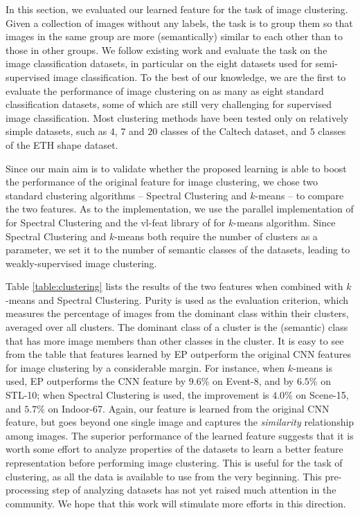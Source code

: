 In this section, we evaluated our learned feature for the task of
image clustering. Given a collection of images without any labels, the
task is to group them so that images in the same group are more
(semantically) similar to each other than to those in other groups.
We follow existing work \citep{Sivic05b,
  Tuytelaars_UnsupervisedSurvey, dai, dai:eccv12b, fakton:eccv12} and
evaluate the task on the image classification datasets, in particular 
on the eight datasets used for semi-supervised image
classification.  To the best of our knowledge, we are the first
to evaluate the performance of image clustering on as many as eight
standard classification datasets, some of which are still very
challenging for supervised image classification. 
Most clustering methods have been tested only on relatively simple
datasets, such as $4$, $7$ and $20$ classes of the Caltech dataset,
and $5$ classes of the ETH shape dataset.

Since our main aim is to validate whether the proposed learning is
able to boost the performance of the original feature for image
clustering, we chose two standard clustering algorithms -- Spectral
Clustering and $k$-means -- to compare the two features.  As to the
implementation, we use the parallel implementation of
\citet{parallel:sc} for Spectral Clustering and the vl-feat library of
\citet{vlfeat} for $k$-means algorithm.  Since Spectral
Clustering and $k$-means both require the number of clusters
as a parameter, we set it to the number of semantic classes of the datasets, leading to
weakly-supervised image clustering. 

Table \ref{table:clustering} lists the results of the two features
when combined with $k$-means and Spectral Clustering.  Purity is used
as the evaluation criterion, which measures the percentage of images
from the dominant class within their clusters, averaged over all
clusters. The dominant class of a cluster is the (semantic) class that
has more image members than other classes in the cluster.  It is easy
to see from the table that features learned by EP outperform the
original CNN features for image clustering by a considerable
margin. For instance, when $k$-means is used, EP outperforms the CNN
feature by $9.6\%$ on Event-8, and by $6.5\%$ on STL-10; when Spectral
Clustering is used, the improvement is $4.0\%$ on Scene-15, and
$5.7\%$ on Indoor-67.  Again, our feature is learned from the original
CNN feature, but goes beyond one single image and captures the
\emph{similarity} relationship among images. The superior performance
of the learned feature suggests that it is worth some effort to
analyze properties of the datasets to learn a better feature
representation before performing image clustering. This is useful for the task of clustering, as all the data is
available to use from the very beginning. This pre-processing step of
analyzing datasets has not yet raised much attention in the community. We
hope that this work will stimulate more efforts in this direction.


